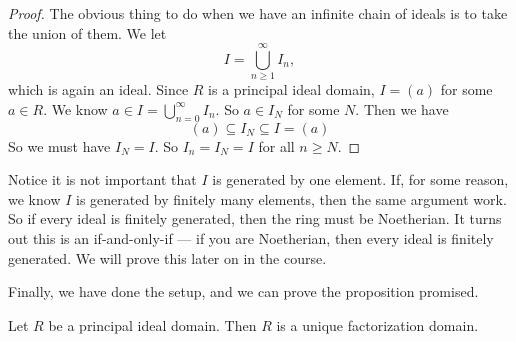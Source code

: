 \documentclass[a4paper]{article}
\begin{document}
\begin{proof}
  The obvious thing to do when we have an infinite chain of ideals is to take the union of them. We let
  \[
    I = \bigcup_{n \geq 1}^\infty I_n,
  \]
  which is again an ideal. Since $R$ is a principal ideal domain, $I = (a)$ for some $a \in R$. We know $a \in I = \bigcup_{n = 0}^\infty I_n$. So $a \in I_N$ for some $N$. Then we have
  \[
    (a) \subseteq I_N \subseteq I = (a)
  \]
  So we must have $I_N = I$. So $I_n = I_N = I$ for all $n \geq N$.
\end{proof}
Notice it is not important that $I$ is generated by one element. If, for some reason, we know $I$ is generated by finitely many elements, then the same argument work. So if every ideal is finitely generated, then the ring must be Noetherian. It turns out this is an if-and-only-if --- if you are Noetherian, then every ideal is finitely generated. We will prove this later on in the course.

Finally, we have done the setup, and we can prove the proposition promised.
\begin{prop}
  Let $R$ be a principal ideal domain. Then $R$ is a unique factorization domain.
\end{prop}
\end{document}
